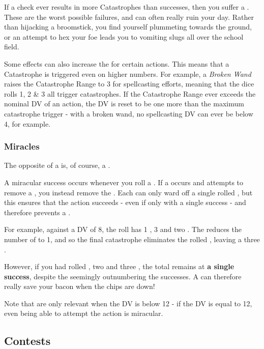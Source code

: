 If a check ever results in more Catastrophes than successes, then you suffer a . These are the worst possible failures, and can often really ruin your day. Rather than hijacking a broomstick, you find yourself plummeting towards the ground, or an attempt to hex your foe leads you to vomiting slugs all over the school field. 

Some effects can also increase the  for certain actions. This means that a Catastrophe is triggered even on higher numbers. For example, a {\it Broken Wand} raises the Catastrophe Range to 3 for spellcasting efforts, meaning that the dice rolls 1, 2 \& 3 all trigger catastrophes. If the Catastrophe Range ever exceeds the nominal DV of an action, the DV is reset to be one more than the maximum catastrophe trigger - with a broken wand, no spellcasting DV can ever be below 4, for example.

\subsubsection{Miracles}

The opposite of a  is, of course, a . 

A miracular success occurs whenever you roll a . If a  occurs and attempts to remove a , you instead remove the . Each  can only ward off a single rolled , but this ensures that the action succeeds - even if only with a single success - and therefore prevents a . 

For example, against a DV of 8, the roll  has 1 , 3  and two . The  reduces the number of  to 1, and so the final catastrophe eliminates the rolled , leaving a three . 

However, if you had rolled , two  and three , the total remains at {\bf a single success}, despite the  seemingly outnumbering the successes. A  can therefore really save your bacon when the chips are down! 

Note that  are only relevant when the DV is below 12 - if the DV is equal to 12, even being able to attempt the action is miracular. 


\subsection{Contests}

